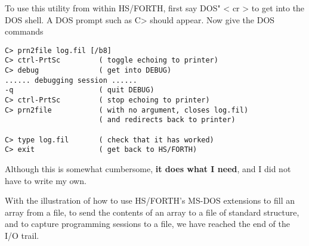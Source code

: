 To use this utility from within HS/FORTH, first say DOS" < cr > to get into the DOS shell.
A DOS prompt such as C> should appear.
Now give the DOS commands

\begin{lstlisting}
C> prn2file log.fil [/b8]
C> ctrl-PrtSc         ( toggle echoing to printer)
C> debug              ( get into DEBUG)
...... debugging session ......
-q                    ( quit DEBUG)
C> ctrl-PrtSc         ( stop echoing to printer)
C> prn2file           ( with no argument, closes log.fil)
                      ( and redirects back to printer)

C> type log.fil       ( check that it has worked)
C> exit               ( get back to HS/FORTH)
\end{lstlisting}

Although this is somewhat cumbersome, \textbf{it does what I need}, and I did not have to write my own.

With the illustration of how to use HS/FORTH's MS-DOS extensions to fill an array from a file, to send the contents of an array to a file of standard structure, and to capture programming sessions to a file, we have reached the end of the I/O trail.
